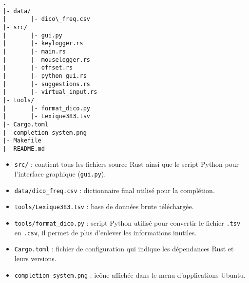 \documentclass[11pt,a4paper]{article}
\begin{document}
\begin{lstlisting}[basicstyle=\ttfamily]
.
|- data/
|       |- dico\_freq.csv
|- src/
|       |- gui.py
|       |- keylogger.rs
|       |- main.rs
|       |- mouselogger.rs
|       |- offset.rs
|       |- python_gui.rs
|       |- suggestions.rs
|       |- virtual_input.rs
|- tools/
|       |- format_dico.py
|       |- Lexique383.tsv
|- Cargo.toml
|- completion-system.png
|- Makefile
|- README.md
\end{lstlisting}


\begin{itemize}
	\item \texttt{src/} : contient tous les fichiers source Rust ainsi que le script Python pour l'interface graphique (\texttt{gui.py}).
	\item \texttt{data/dico\_freq.csv} : dictionnaire final utilisé pour la complétion.
	\item \texttt{tools/Lexique383.tsv} : base de données brute téléchargée.
	\item \texttt{tools/format\_dico.py} : script Python utilisé pour convertir le fichier \texttt{.tsv} en \texttt{.csv}, il permet de plus d'enlever les informations inutiles.
	\item \texttt{Cargo.toml} : fichier de configuration qui indique les dépendances Rust et leurs versions.
	\item \texttt{completion-system.png} : icône affichée dans le menu d’applications Ubuntu.
\end{itemize}
\end{document}
